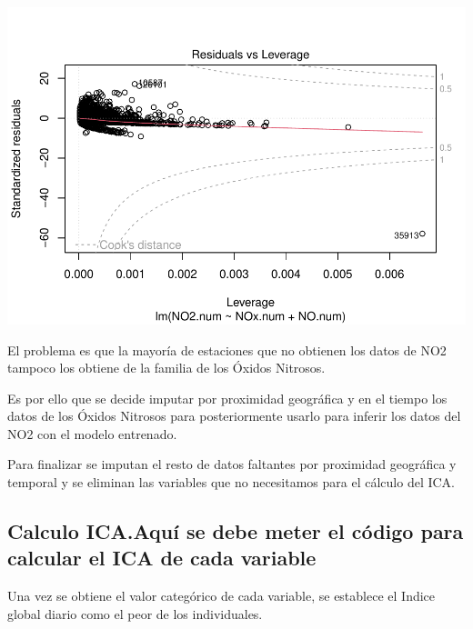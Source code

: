 \documentclass[notspecified,article,submit,moreauthors,pdftex]{Definitions/mdpi}
\begin{document}
\includegraphics{ProyectoAED2023_files/figure-latex/unnamed-chunk-14-4.pdf}

El problema es que la mayoría de estaciones que no obtienen los datos de
NO2 tampoco los obtiene de la familia de los Óxidos Nitrosos.

Es por ello que se decide imputar por proximidad geográfica y en el
tiempo los datos de los Óxidos Nitrosos para posteriormente usarlo para
inferir los datos del NO2 con el modelo entrenado.

Para finalizar se imputan el resto de datos faltantes por proximidad
geográfica y temporal y se eliminan las variables que no necesitamos
para el cálculo del ICA.

\hypertarget{calculo-ica.aquuxed-se-debe-meter-el-cuxf3digo-para-calcular-el-ica-de-cada-variable}{%
\subsection{Calculo ICA.Aquí se debe meter el código para calcular el
ICA de cada
variable}\label{calculo-ica.aquuxed-se-debe-meter-el-cuxf3digo-para-calcular-el-ica-de-cada-variable}}

Una vez se obtiene el valor categórico de cada variable, se establece el
Indice global diario como el peor de los individuales.
\end{document}
